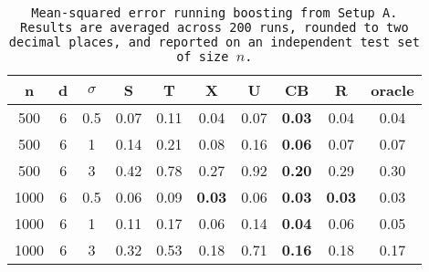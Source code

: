 \begin{table}[ht]
\centering
\begin{tabular}{cccccccccc}
  \hline
n & d & $\sigma$ & S & T & X & U & CB & R & oracle \\ 
  \hline
500 & 6 & 0.5 & 0.07 & 0.11 & 0.04 & 0.07 & \bf 0.03 & 0.04 & 0.04 \\ 
  500 & 6 & 1 & 0.14 & 0.21 & 0.08 & 0.16 & \bf 0.06 & 0.07 & 0.07 \\ 
  500 & 6 & 3 & 0.42 & 0.78 & 0.27 & 0.92 & \bf 0.20 & 0.29 & 0.30 \\ 
  1000 & 6 & 0.5 & 0.06 & 0.09 & \bf 0.03 & 0.06 & \bf 0.03 & \bf 0.03 & 0.03 \\ 
  1000 & 6 & 1 & 0.11 & 0.17 & 0.06 & 0.14 & \bf 0.04 & 0.06 & 0.05 \\ 
  1000 & 6 & 3 & 0.32 & 0.53 & 0.18 & 0.71 & \bf 0.16 & 0.18 & 0.17 \\ 
   \hline
\end{tabular}
\caption{\tt Mean-squared error running \texttt{boosting} from Setup A. Results are averaged across 200 runs, rounded to two decimal places, and reported on an independent test set of size $n$.} 
\label{table:setup1}
\end{table}
